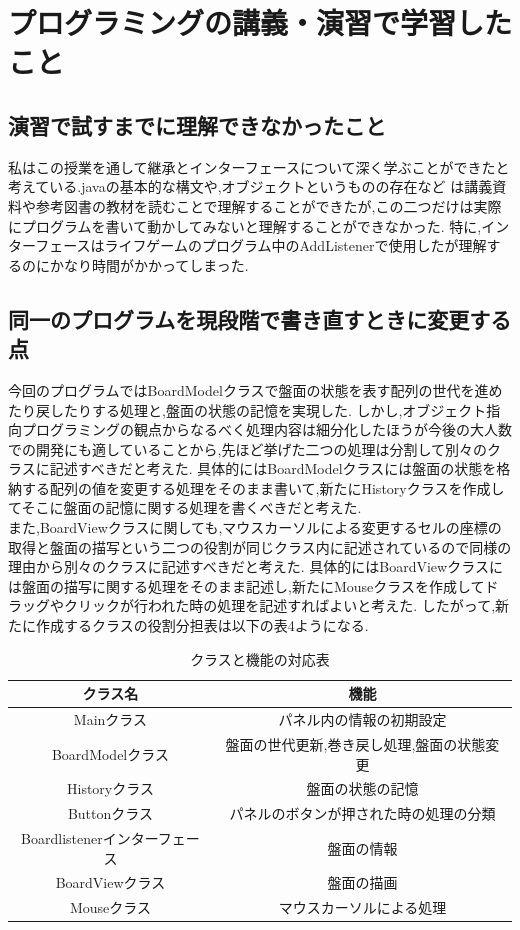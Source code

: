 \documentclass[dvipdfmx]{jarticle}
\begin{document}
\section{プログラミングの講義・演習で学習したこと}
\subsection{演習で試すまでに理解できなかったこと}
私はこの授業を通して継承とインターフェースについて深く学ぶことができたと考えている.javaの基本的な構文や,オブジェクトというものの存在など
は講義資料や参考図書の教材を読むことで理解することができたが,この二つだけは実際にプログラムを書いて動かしてみないと理解することができなかった.
特に,インターフェースはライフゲームのプログラム中のAddListenerで使用したが理解するのにかなり時間がかかってしまった.
\subsection{同一のプログラムを現段階で書き直すときに変更する点}
今回のプログラムではBoardModelクラスで盤面の状態を表す配列の世代を進めたり戻したりする処理と,盤面の状態の記憶を実現した.
しかし,オブジェクト指向プログラミングの観点からなるべく処理内容は細分化したほうが今後の大人数での開発にも適していることから,先ほど挙げた二つの処理は分割して別々のクラスに記述すべきだと考えた.
具体的にはBoardModelクラスには盤面の状態を格納する配列の値を変更する処理をそのまま書いて,新たにHistoryクラスを作成してそこに盤面の記憶に関する処理を書くべきだと考えた.\\
また,BoardViewクラスに関しても,マウスカーソルによる変更するセルの座標の取得と盤面の描写という二つの役割が同じクラス内に記述されているので同様の理由から別々のクラスに記述すべきだと考えた.
具体的にはBoardViewクラスには盤面の描写に関する処理をそのまま記述し,新たにMouseクラスを作成してドラッグやクリックが行われた時の処理を記述すればよいと考えた.
したがって,新たに作成するクラスの役割分担表は以下の表4ようになる.
\begin{table}[h]
  \centering
  \begin{tabular}{|c|c|}
    \hline
    クラス名&機能\\\hline\hline
    Mainクラス&パネル内の情報の初期設定\\\hline
    BoardModelクラス&盤面の世代更新,巻き戻し処理,盤面の状態変更\\\hline
    Historyクラス&盤面の状態の記憶\\\hline
    Buttonクラス&パネルのボタンが押された時の処理の分類\\\hline
    Boardlistenerインターフェース&盤面の情報\\\hline
    BoardViewクラス&盤面の描画\\\hline
    Mouseクラス&マウスカーソルによる処理\\\hline
  \end{tabular}
  \caption{クラスと機能の対応表}
\end{table}
\end{document}
